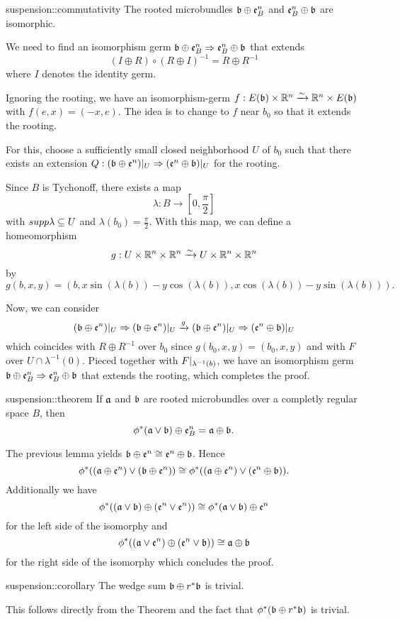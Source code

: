 \begin{mylemma}{suspension::commutativity}%
    The rooted microbundles $\mathfrak{b} \oplus \mathfrak{e}^{n}_B$ and $\mathfrak{e}^{n}_B \oplus \mathfrak{b}$ are isomorphic. 
\end{mylemma}
\begin{myproof}
    We need to find an isomorphism germ $\mathfrak{b} \oplus \mathfrak{e}^{n}_B \Rightarrow{} \mathfrak{e}^{n}_B \oplus \mathfrak{b}$ that extends
    \[ (I \oplus R) \circ (R \oplus I)^{-1} = R \oplus R^{-1} \]
    where $I$ denotes the identity germ.

    Ignoring the rooting, we have an isomorphism-germ $f: E(\mathfrak{b}) \times \mathbb{R}^n \xrightarrow{\sim} \mathbb{R}^n \times E(\mathfrak{b})$ with $f(e, x) = (-x, e)$.
    The idea is to change to $f$ near $b_0$ so that it extends the rooting.

    For this, choose a sufficiently small closed neighborhood $U$ of $b_0$
    such that there exists an extension $Q: (\mathfrak{b} \oplus \mathfrak{e}^{n})\vert_{U} \Rightarrow{} (\mathfrak{e}^{n} \oplus \mathfrak{b})\vert_{U}$ for the rooting.

    Since $B$ is Tychonoff, there exists a map
    \[ \lambda: B \to [0, \frac{\pi}{2}] \]
    with $supp \lambda \subseteq{} U$ and $\lambda(b_0) = \frac{\pi}{2}$.
    With this map, we can define a homeomorphism
    \[ g: U \times \mathbb{R}^n \times \mathbb{R}^n \xrightarrow{\sim} U \times \mathbb{R}^n \times \mathbb{R}^n \]
    by
    \[ g(b, x, y) = (b, x \sin(\lambda(b)) - y \cos(\lambda(b)), x \cos(\lambda(b)) - y \sin(\lambda(b))). \]

    Now, we can consider
    \[ (\mathfrak{b} \oplus \mathfrak{e}^{n})\vert_{U} \Rightarrow{} (\mathfrak{b} \oplus \mathfrak{e}^{n})\vert_{U} \xrightarrow{g} (\mathfrak{b} \oplus \mathfrak{e}^{n})\vert_{U} \Rightarrow{} (\mathfrak{e}^{n} \oplus \mathfrak{b})\vert_{U}\]
    which coincides with $R \oplus R^{-1}$ over $b_0$ since $g(b_0, x, y) = (b_0, x, y)$ and with $F$ over $U \cap \lambda^{-1}(0)$.
    Pieced together with $F\vert_{\lambda^{-1}(b)}$, we have an isomorphism germ $\mathfrak{b} \oplus \mathfrak{e}^{n}_B \Rightarrow{} \mathfrak{e}^{n}_B \oplus \mathfrak{b}$ that extends the rooting, which completes the proof.
\end{myproof}

\begin{mytheorem}{suspension::theorem}
    If $\mathfrak{a}$ and $\mathfrak{b}$ are rooted microbundles over a completly regular space $B$, then
    \[ \phi^*(\mathfrak{a} \vee \mathfrak{b}) \oplus \mathfrak{e}^{n}_B = \mathfrak{a} \oplus \mathfrak{b}. \]
\end{mytheorem}
\begin{myproof}
    The previous lemma yields $\mathfrak{b} \oplus \mathfrak{e}^{n} \cong \mathfrak{e}^{n} \oplus \mathfrak{b}$.
    Hence
    \[ \phi^*((\mathfrak{a} \oplus \mathfrak{e}^{n}) \vee (\mathfrak{b} \oplus \mathfrak{e}^{n})) \cong \phi^*((\mathfrak{a} \oplus \mathfrak{e}^{n}) \vee (\mathfrak{e}^{n} \oplus \mathfrak{b})). \]
    Additionally we have
    \[ \phi^*((\mathfrak{a} \vee \mathfrak{b}) \oplus (\mathfrak{e}^{n} \vee \mathfrak{e}^{n})) \cong \phi^*(\mathfrak{a} \vee \mathfrak{b}) \oplus \mathfrak{e}^{n} \]
    for the left side of the isomorphy and
    \[ \phi^*((\mathfrak{a} \vee \mathfrak{e}^{n}) \oplus (\mathfrak{e}^{n} \vee \mathfrak{b})) \cong \mathfrak{a} \oplus \mathfrak{b}\]
    for the right side of the isomorphy which concludes the proof.
\end{myproof}

\begin{mycorollary}{suspension::corollary}
    The wedge sum $\mathfrak{b} \oplus r^*\mathfrak{b}$ is trivial.
\end{mycorollary}
\begin{myproof}
    This follows directly from the Theorem and the fact that $\phi^*(\mathfrak{b} \oplus r^*\mathfrak{b})$ is trivial.
\end{myproof}

